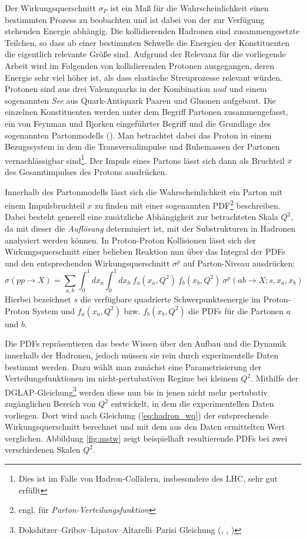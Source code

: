 Der Wirkungsquerschnitt $\sigma_P$ ist ein Maß für die Wahrscheinlichkeit einen
bestimmten Prozess zu beobachten und ist dabei von der zur Verfügung stehenden
Energie abhängig. Die kollidierenden Hadronen sind zusammengesetzte Teilchen,
so dass ab einer bestimmten Schwelle die Energien der Konstituenten die
eigentlich relevante Größe sind. Aufgrund der Relevanz für die vorliegende
Arbeit wird im Folgenden von kollidierenden Protonen ausgegangen, deren Energie
sehr viel höher ist, als dass elastische Streuprozesse relevant würden.
Protonen sind aus drei Valenzquarks in der Kombination $uud$ und einem
sogenannten \textit{See} aus Quark-Antiquark Paaren und Gluonen aufgebaut. Die
einzelnen Konstituenten werden unter dem Begriff Partonen zusammengefasst, ein
von Feynman und Bjorken eingeführter Begriff und die Grundlage des sogenannten
Partonmodells (\cite{Bjorken:1968dy}). Man betrachtet dabei das Proton in einem
Bezugssystem in dem die Transversalimpulse und Ruhemassen der Partonen
vernachlässigbar sind\footnote{Dies ist im Falle von Hadron-Collidern,
insbesondere des \ac{LHC}, sehr gut erfüllt}. Der Impuls eines Partons lässt
sich dann als Bruchteil $x$ des Gesamtimpulses des Protons ausdrücken.

\pagebreak

Innerhalb des Partonmodells lässt sich die Wahrscheinlichkeit ein Parton mit
einem Impulsbruchteil $x$ zu finden mit einer sogenannten
\ac{PDF}\footnote{engl. für \textit{Parton-Verteilungsfunktion}} beschreiben.
Dabei besteht generell eine zusätzliche Abhängigkeit zur betrachteten Skala
$Q^2$, da mit dieser die \textit{Auflösung} determiniert ist, mit der
Substrukturen in Hadronen analysiert werden können. In Proton-Proton
Kollisionen lässt sich der Wirkungsquerschnitt einer belieben Reaktion nun über
das Integral der \ac{PDF}s und den entsprechenden Wirkungsquerschnitt
$\sigma^p$ auf Parton-Niveau ausdrücken:
\begin{equation}
    \sigma(pp\rightarrow X) = \sum_{a,b} \int_0^1 dx_a \int_0^1 dx_b \;
        f_a(x_a,Q^2) \: f_b(x_b,Q^2) \: \sigma^p(ab\rightarrow X;s,x_a,x_b)
    \label{eq:hadron_wq}
\end{equation}
Hierbei bezeichnet $s$ die verfügbare quadrierte Schwerpunktsenergie im
Proton-Proton System und $f_a(x_a,Q^2)$ bzw. $f_b(x_b,Q^2)$ die \ac{PDF}s für
die Partonen $a$ und $b$.

Die \ac{PDF}s repräsentieren das beste Wissen über den Aufbau und die Dynamik
innerhalb der Hadronen, jedoch müssen sie rein durch experimentelle Daten
bestimmt werden.
Dazu wählt man zunächst eine Parametrisierung der Verteilungsfunktionen im
nicht-pertubativen Regime bei kleinem $Q^2$. Mithilfe der
DGLAP-Gleichung\footnote{Dokshitzer–Gribov–Lipatov–Altarelli–Parisi Gleichung
(\cite{Altarelli:1977zs}, \cite{Dokshitzer:1977sg}, \cite{Gribov:1972ri})} 
werden diese nun bis in jenen nicht mehr pertubativ zugänglichen Bereich von
$Q^2$ entwickelt, in dem die experimentellen Daten vorliegen. Dort wird nach
Gleichung (\ref{eq:hadron_wq}) der entsprechende Wirkungsquerschnitt berechnet
und mit dem aus den Daten ermittelten Wert verglichen. Abbildung \ref{fig:mstw}
zeigt beispielhaft resultierende \ac{PDF}s bei zwei verschiedenen Skalen $Q^2$.

